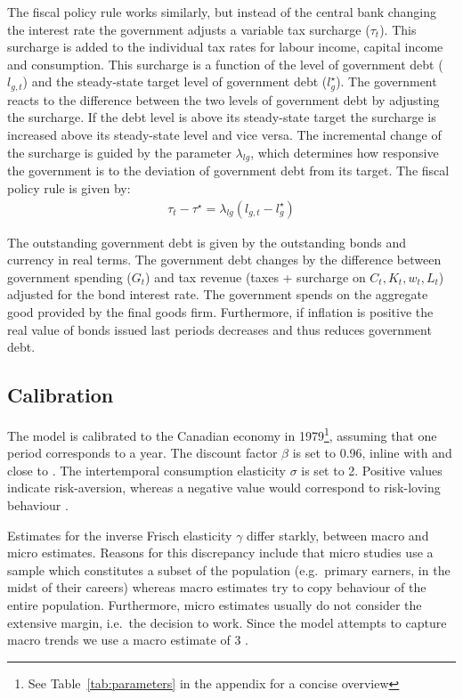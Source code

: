 \documentclass[12pt]{article}
\begin{document}
The fiscal policy rule works similarly, but instead of the central bank changing the interest rate the government adjusts a variable tax surcharge ($\tau_t$). This surcharge is added to the individual tax rates for labour income, capital income and consumption. This surcharge is a function of the level of government debt ($l_{g,t}$) and the steady-state target level of government debt ($l^{\star}_{g}$). The government reacts to the difference between the two levels of government debt by adjusting the surcharge. If the debt level is above its steady-state target the surcharge is increased above its steady-state level and vice versa. The incremental change of the surcharge is guided by the parameter $\lambda_{l g}$, which determines how responsive the government is to the deviation of government debt from its target. The fiscal policy rule is given by:
\begin{align}
    \tau_t - \tau^{\star} = \lambda_{l g} (l_{g,t} - l^{\star}_{g})
\end{align}

The outstanding government debt is given by the outstanding bonds and currency in real terms. The government debt changes by the difference between government spending ($G_t$) and tax revenue (taxes + surcharge on $C_t, K_t, w_t,L_t$) adjusted for the bond interest rate. The government spends on the aggregate good provided by the final goods firm. Furthermore, if inflation is positive the real value of bonds issued last periods decreases and thus reduces government debt.


\subsection*{Calibration}
The model is calibrated to the Canadian economy in 1979\footnote{See Table~\ref{tab:parameters} in the appendix for a concise overview}, assuming that one period corresponds to a year. 
The discount factor $\beta$ is set to 0.96, inline with \textcite{someOilDemandSupply2023} and close to \textcite{corriganToTEMIIIBank2021}. 
The intertemporal consumption elasticity $\sigma$ is set to 2. Positive values indicate risk-aversion, whereas a negative value would correspond to risk-loving behaviour
\parencite{thimmeIntertemporalSubstitutionConsumption2017}.

Estimates for the inverse Frisch elasticity $\gamma$ differ starkly, between macro and micro estimates. Reasons for this discrepancy
include that micro studies use a sample which constitutes a subset of the population (e.g.\ primary earners, in the midst of their careers) whereas macro 
estimates try to copy behaviour of the entire population. Furthermore, micro estimates usually do not consider the extensive margin, i.e.\ the decision to work. Since the model attempts to capture macro trends we use a macro estimate of 3 \parencite{petermanReconcilingMicroMacro2016}. 
\end{document}
